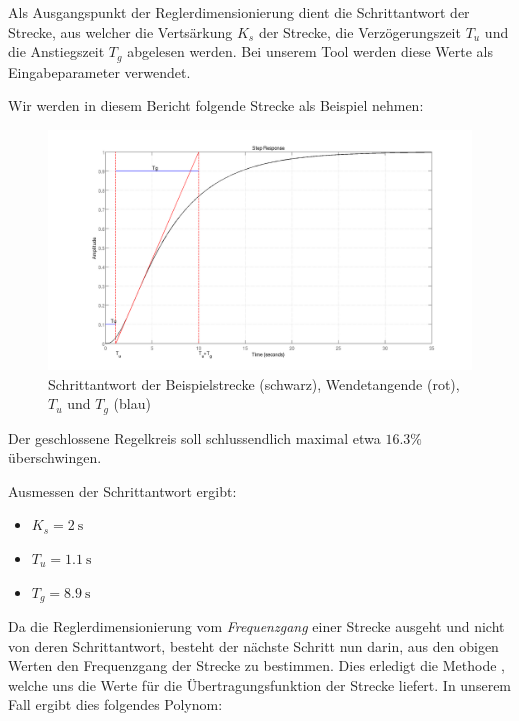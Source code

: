 Als   Ausgangspunkt  der   Reglerdimensionierung   dient  die   Schrittantwort
der  Strecke,   aus  welcher   die  Verts\"arkung   $K_s$  der   Strecke,  die
Verz\"ogerungszeit  $T_u$ und  die Anstiegszeit  $T_g$ abgelesen  werden.  Bei
unserem Tool werden diese Werte als Eingabeparameter verwendet.

Wir werden in diesem Bericht folgende Strecke als Beispiel nehmen:
\begin{figure}[h! width=\pagewidth]
    \includegraphics[width=\textwidth]{images/streckeSchrittantwort.png}
    \caption{%
    Schrittantwort der  Beispielstrecke (schwarz), Wendetangende  (rot), $T_u$
    und $T_g$ (blau)%
    }
    \label{fig:plant_step}
\end{figure}

Der  geschlossene   Regelkreis  soll  schlussendlich  maximal   etwa  $16.3\%$
\"uberschwingen.

Ausmessen der Schrittantwort ergibt:
\begin{itemize}
    \item
        $K_s = \SI{2}{\second}$
    \item
        $T_u = \SI{1.1}{\second}$
    \item
        $T_g = \SI{8.9}{\second}$
\end{itemize}

Da die Reglerdimensionierung vom \emph{Frequenzgang} einer Strecke ausgeht und
nicht von deren  Schrittantwort, besteht der n\"achste Schritt  nun darin, aus
den obigen Werten den Frequenzgang der Strecke zu bestimmen. Dies erledigt die
Methode  \footnotemark[1],   welche  uns  die  Werte  f\"ur  die
\"Ubertragungsfunktion  der  Strecke  liefert.     In unserem  Fall ergibt
dies folgendes Polynom:

